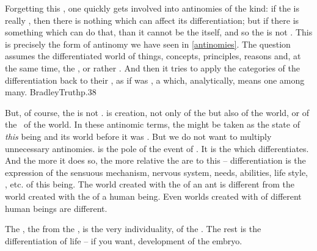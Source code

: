 Forgetting this , one quickly gets involved into antinomies of
the kind: if the  is really , then there is nothing which can
affect its differentiation; but if there is something which can do that, than it
cannot be the  itself, and so the  is not .  This is
precisely the form of antinomy we have seen in \ref{antinomies}. The question
assumes the differentiated world of things, concepts, principles, reasons and,
at the same time,  the , or rather .  And then it
tries to apply the  categories of the differentiation back to
their , as if  was , a 
which, analytically, means one among many.  \citet{You cannot take reality to
  pieces and then see how once more it can be combined to make
  reality.}{BradleyTruth}{p.38}


But, of course, the  is not .   is creation, not only
of the  but also of the world, or of the \nexus\ of the
world. In these antinomic terms, the  might be taken as the state of
{\em this} being and its world before it was . But we do not want to
multiply unnecessary antinomies.  is the  pole of the
event of . It is the  which differentiates.  And the
more it does so, the more relative the  are to this
 -- differentiation is the expression of the sensuous mechanism,
nervous system, needs, abilities, life style, , etc.  of this
being.  The world created with the  of an ant is different from the
world created with the  of a human being.  Even worlds created with
 of different human beings are different.

The , the  from the , is the very
individuality,  of the .  The rest is the
differentiation of life -- if you want, development of the embryo.

